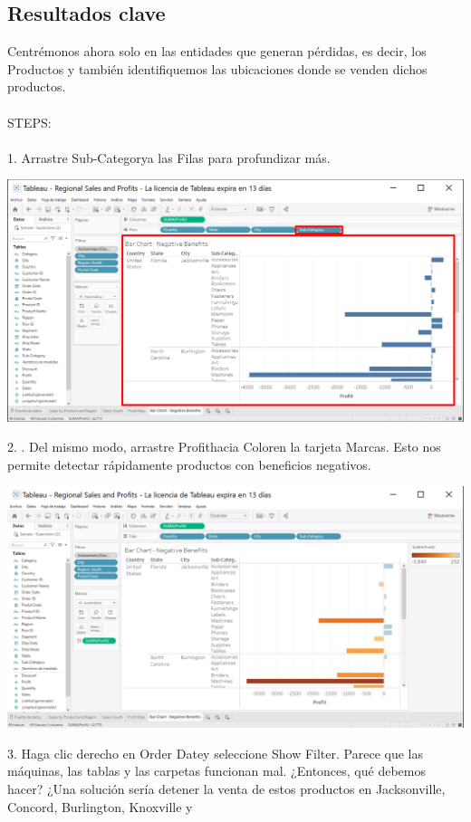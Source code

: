 \documentclass[12pt,letterpaper]{article}
\begin{document}
\subsection{Resultados clave}
Centrémonos ahora solo en las entidades que generan pérdidas, es decir, los
Productos y también identifiquemos las ubicaciones donde se venden dichos
productos.
\\\\STEPS:
\\\\1. Arrastre Sub-Categorya las Filas para profundizar más.
\begin{center}
    \includegraphics[width=16cm]{img/39.png}  
\end{center}
2. . Del mismo modo, arrastre Profithacia Coloren la tarjeta Marcas. Esto nos permite detectar
rápidamente productos con beneficios negativos.
\begin{center}
    \includegraphics[width=16cm]{img/38.png}  
\end{center}
3. Haga clic derecho en Order Datey seleccione Show Filter. Parece que las máquinas, las
tablas y las carpetas funcionan mal. ¿Entonces, qué debemos hacer? ¿Una solución sería detener
la venta de estos productos en Jacksonville, Concord, Burlington, Knoxville y
\end{document}

